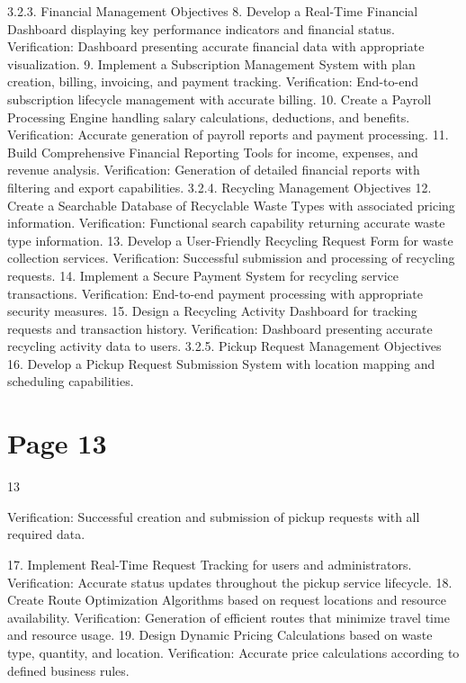 \documentclass{article}
\begin{document}
 
    3.2.3. Financial Management Objectives 
 8. Develop a Real-Time Financial Dashboard displaying key performance indicators     
and financial status. 
Verification: Dashboard presenting accurate financial data with appropriate 
visualization. 
9. Implement a Subscription Management System with plan creation, billing, invoicing, 
and payment tracking. 
Verification: End-to-end subscription lifecycle management with accurate billing. 
10. Create a Payroll Processing Engine handling salary calculations, deductions, and 
benefits. 
Verification: Accurate generation of payroll reports and payment processing. 
11. Build Comprehensive Financial Reporting Tools for income, expenses, and revenue 
analysis. 
Verification: Generation of detailed financial reports with filtering and export 
capabilities. 
    3.2.4. Recycling Management Objectives 
12. Create a Searchable Database of Recyclable Waste Types with associated pricing 
information. 
Verification: Functional search capability returning accurate waste type information. 
13. Develop a User-Friendly Recycling Request Form for waste collection services. 
Verification: Successful submission and processing of recycling requests. 
14. Implement a Secure Payment System for recycling service transactions. 
Verification: End-to-end payment processing with appropriate security measures. 
15. Design a Recycling Activity Dashboard for tracking requests and transaction history. 
Verification: Dashboard presenting accurate recycling activity data to users. 
    3.2.5. Pickup Request Management Objectives 
16. Develop a Pickup Request Submission System with location mapping and scheduling 
capabilities. 

\section*{Page 13}
   
 
 13  
 
Verification: Successful creation and submission of pickup requests with all required data. 
 
17. Implement Real-Time Request Tracking for users and administrators. 
Verification: Accurate status updates throughout the pickup service lifecycle. 
18. Create Route Optimization Algorithms based on request locations and resource availability. 
Verification: Generation of efficient routes that minimize travel time and resource usage. 
19. Design Dynamic Pricing Calculations based on waste type, quantity, and location. 
Verification: Accurate price calculations according to defined business rules. 
 
\end{document}
